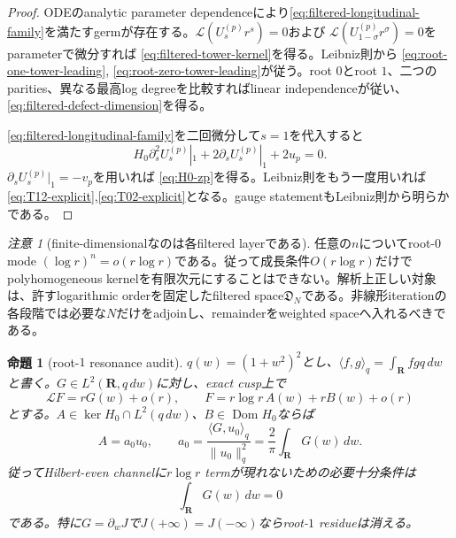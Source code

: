 \documentclass[11pt,a4paper]{ltjsarticle}
\newtheorem{proposition}[theorem]{命題}
\theoremstyle{definition}
\theoremstyle{remark}
\newtheorem{remark}[theorem]{注意}
\newcommand{\RR}{\mathbf R}
\begin{document}
\begin{proof}
ODEのanalytic parameter dependenceにより\eqref{eq:filtered-longitudinal-family}を満たすgermが存在する。$\mathscr L(U_s^{(p)}r^s)=0$および
$\mathscr L(U_{1-\sigma}^{(p)}r^\sigma)=0$をparameterで微分すれば
\eqref{eq:filtered-tower-kernel}を得る。Leibniz則から
\eqref{eq:root-one-tower-leading},
\eqref{eq:root-zero-tower-leading}が従う。root $0$とroot $1$、二つのparities、異なる最高log degreeを比較すればlinear independenceが従い、\eqref{eq:filtered-defect-dimension}を得る。

\eqref{eq:filtered-longitudinal-family}を二回微分して$s=1$を代入すると
\[
 H_0\partial_s^2U_s^{(p)}|_1
 +2\partial_sU_s^{(p)}|_1+2u_p=0.
\]
$\partial_sU_s^{(p)}|_1=-v_p$を用いれば
\eqref{eq:H0-zp}を得る。Leibniz則をもう一度用いれば
\eqref{eq:T12-explicit},\eqref{eq:T02-explicit}となる。gauge statementもLeibniz則から明らかである。
\end{proof}

\begin{remark}[finite-dimensionalなのは各filtered layerである]\label{rem:no-complete-low-growth-block}
任意の$n$についてroot-$0$ mode $(\log r)^n=o(r\log r)$である。従って成長条件$O(r\log r)$だけでpolyhomogeneous kernelを有限次元にすることはできない。解析上正しい対象は、許すlogarithmic orderを固定したfiltered space$\mathfrak D_N$である。非線形iterationの各段階では必要な$N$だけをadjoinし、remainderをweighted spaceへ入れるべきである。
\end{remark}

\begin{proposition}[root-$1$ resonance audit]\label{prop:root-one-resonance-audit}
$q(w)=(1+w^2)^2$とし、$\langle f,g\rangle_q=\int_{\RR}fgq\,dw$と書く。$G\in L^2(\RR,q\,dw)$に対し、exact cusp上で
\begin{equation}\label{eq:resonant-inhomogeneous-expansion}
 \mathscr L F=rG(w)+o(r),
 \qquad
 F=r\log r\,A(w)+rB(w)+o(r)
\end{equation}
とする。$A\in\ker H_0\cap L^2(q\,dw)$、$B\in\operatorname{Dom}H_0$ならば
\begin{equation}\label{eq:root-one-residue-formula}
 A=a_0u_0,
 \qquad
 a_0
 =\frac{\langle G,u_0\rangle_q}{\|u_0\|_q^2}
 =\frac{2}{\pi}\int_{\RR}G(w)\,dw.
\end{equation}
従ってHilbert-even channelに$r\log r$ termが現れないための必要十分条件は
\begin{equation}\label{eq:no-rlog-moment-condition}
 \int_{\RR}G(w)\,dw=0
\end{equation}
である。特に$G=\partial_wJ$で$J(+\infty)=J(-\infty)$ならroot-$1$ residueは消える。
\end{proposition}
\end{document}
